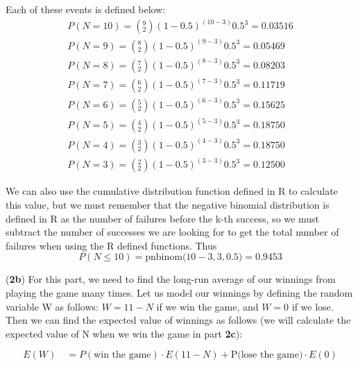 \documentclass{article}
\begin{document}
Each of these events is defined below:
\begin{align*}
    
  P(N=10) = ( \text{$_{2}^{9}$} )(1 - 0.5)^{(10 - 3)}0.5^3 = 0.03516\\
  
  P(N=9) = ( \text{$_{2}^{8}$} )(1 - 0.5)^{(9 - 3)}0.5^3 = 0.05469\\
  
  P(N=8) = ( \text{$_{2}^{7}$} )(1 - 0.5)^{(8 - 3)}0.5^3 = 0.08203\\
  
  P(N=7) = ( \text{$_{2}^{6}$} )(1 - 0.5)^{(7 - 3)}0.5^3 = 0.11719\\
  
  P(N=6) = ( \text{$_{2}^{5}$} )(1 - 0.5)^{(6 - 3)}0.5^3 = 0.15625\\
  
  P(N=5) = ( \text{$_{2}^{4}$} )(1 - 0.5)^{(5 - 3)}0.5^3 = 0.18750\\
  
  P(N=4) = ( \text{$_{2}^{3}$} )(1 - 0.5)^{(4 - 3)}0.5^3 = 0.18750\\
  
  P(N=3) = ( \text{$_{2}^{2}$} )(1 - 0.5)^{(3 - 3)}0.5^3 = 0.12500
\end{align*}  

We can also use the cumulative distribution function defined in R to calculate this value, but we must remember that the negative binomial distribution is defined in R as the number of failures before the k-th success, so we must subtract the number of successes we are looking for to get the total number of failures when using the R defined functions.  Thus
\begin{equation}
P(N \leq 10) = \text{pnbinom(}10 - 3, 3, 0.5\text{)} = 0.9453
\end{equation}

\item(\textbf{2b})
For this part, we need to find the long-run average of our winnings from playing the game many times.
Let us model our winnings by defining the random variable W as follows: $W = 11 - N$ if we win the game, and $W = 0$ if we lose. Then we can find the expected value of winnings as follows (we will calculate the expected value of N when we win the game in part \textbf{2c}):

\begin{equation}
    E(W) \quad = P(\text{win the game}) \cdot E(11 - N) + \text{P(lose the game)} \cdot E(0)
\end{equation}
    
\end{document}

